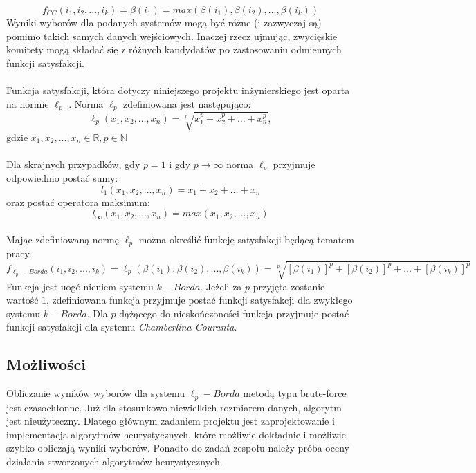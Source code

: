 \documentclass[polish,11pt]{aghthesis}
\begin{document}
\begin{equation}
\label{eq:cc}
f_{CC}(i_1, i_2, ..., i_k) = \beta(i_1) = max(\beta(i_1), \beta(i_2), ..., \beta(i_k))
\end{equation}
Wyniki wyborów dla podanych systemów mogą być różne (i zazwyczaj są) pomimo takich
samych danych wejściowych. Inaczej rzecz ujmując, zwycięskie komitety mogą składać się z
różnych kandydatów po zastosowaniu odmiennych funkcji satysfakcji. \\ \\
Funkcja satysfakcji, która dotyczy niniejszego projektu inżynierskiego jest oparta na normie
$\ell_p$ . Norma $\ell_p$ zdefiniowana jest następująco:
\begin{equation}
\ell_p(x_1,x_2,\dots, x_n) = \sqrt[p]{x_1^p+x_2^p+\dots+x_n^p},
\end{equation}
gdzie $x_1, x_2, ..., x_n \in \mathbb{R}, p \in \mathbb{N}$ \\ \\
Dla skrajnych przypadków, gdy $p = 1$ i gdy $p \to \infty$ norma $\ell_p$ przyjmuje odpowiednio postać sumy: 
\begin{equation}
l_1(x_1, x_2,\dots, x_n) = x_1 + x_2 +\dots+ x_n
\end{equation}
oraz postać operatora maksimum: 
\begin{equation}
l_\infty(x_1, x_2,\dots, x_n) = max(x_1, x_2,\dots, x_n)
\end{equation}
\\ Mając zdefiniowaną normę $\ell_p$ można określić funkcję satysfakcji będącą tematem pracy. 
\begin{equation}
f_{{\ell_p}-Borda}(i_1, i_2, ..., i_k) = \ell_p(\beta(i_1), \beta(i_2), ..., \beta(i_k)) = \sqrt[p]{[\beta(i_1)]^p+[\beta(i_2)]^p+\dots+[\beta(i_k)]^p}
\end{equation}
\clearpage
\noindent Funkcja jest uogólnieniem systemu $k-Borda$. Jeżeli za $p$ przyjęta zostanie wartość $1$,
zdefiniowana funkcja przyjmuje postać funkcji satysfakcji dla zwykłego systemu $k-Borda$. Dla $p$ dążącego do nieskończoności funkcja przyjmuje postać funkcji satysfakcji dla systemu
\textit{Chamberlina-Couranta}.


\subsection{Możliwości}
Obliczanie wyników wyborów dla systemu $\ell_p-Borda$ metodą typu brute-force jest
czasochłonne. Już dla stosunkowo niewielkich rozmiarem danych, algorytm jest nieużyteczny. Dlatego głównym zadaniem projektu jest zaprojektowanie i implementacja algorytmów heurystycznych, które możliwie dokładnie i możliwie szybko obliczają wyniki wyborów. Ponadto do zadań zespołu należy próba oceny działania stworzonych algorytmów heurystycznych.
\end{document}
